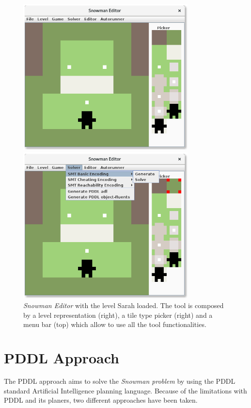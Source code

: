 \documentclass{report}
\theoremstyle{plain}
\begin{document}
\begin{figure}
    \begin{minipage}{0.5\textwidth}
    \centering
    \includegraphics[width=0.8\textwidth]{gui-1.png}
    \end{minipage}
    \begin{minipage}{0.5\textwidth}
    \centering
    \includegraphics[width=0.8\textwidth]{gui-2.png}
    \end{minipage}
    \caption{\emph{Snowman Editor} with the level Sarah loaded. The tool is composed by a level representation (right), a tile type picker (right) and a menu bar (top) which allow to use all the tool functionalities.}
    \label{fig:gui}
\end{figure}

\section{PDDL Approach}
The PDDL approach aims to solve the \emph{Snowman problem} by using the PDDL standard Artificial Intelligence planning language. Because of the limitations with PDDL and its planers, two different approaches have been taken. 
\end{document}
